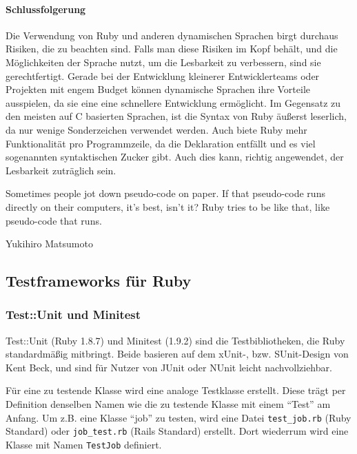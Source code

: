 \paragraph{Schlussfolgerung}

Die Verwendung von Ruby und anderen dynamischen Sprachen birgt durchaus Risiken, die zu beachten sind. Falls man diese Risiken im Kopf behält, und die Möglichkeiten der Sprache nutzt, um die Lesbarkeit zu verbessern, sind sie gerechtfertigt. Gerade bei der Entwicklung kleinerer Entwicklerteams oder Projekten mit engem Budget können dynamische Sprachen ihre Vorteile ausspielen, da sie eine eine schnellere Entwicklung ermöglicht. Im Gegensatz zu den meisten auf C basierten Sprachen, ist die Syntax von Ruby äußerst leserlich, da nur wenige Sonderzeichen verwendet werden. Auch biete Ruby mehr Funktionalität pro Programmzeile, da die Deklaration entfällt und es viel sogenannten syntaktischen Zucker gibt. Auch dies kann, richtig angewendet, der Lesbarkeit zuträglich sein.
\epigraph{Sometimes people jot down pseudo-code on paper. If that pseudo-code runs directly on their computers, it's best, isn't it? Ruby tries to be like that, like pseudo-code that runs. }{Yukihiro Matsumoto}


\subsection{Testframeworks für Ruby}
\subsubsection{Test::Unit und Minitest}
Test::Unit (Ruby 1.8.7) und Minitest (1.9.2) sind die Testbibliotheken, die Ruby standardmäßig mitbringt. Beide basieren auf dem xUnit-, bzw. SUnit-Design von Kent Beck, und sind für Nutzer von JUnit oder NUnit leicht nachvollziehbar. %

Für eine zu testende Klasse wird eine analoge Testklasse erstellt. Diese trägt per Definition denselben Namen wie die zu testende Klasse mit einem "`Test"' am Anfang. Um z.B. eine Klasse "`job"' zu testen, wird eine Datei \texttt{test\_job.rb} (Ruby Standard) oder \texttt{job\_test.rb} (Rails Standard) erstellt. Dort wiederrum wird eine Klasse mit Namen \texttt{TestJob} definiert. 

